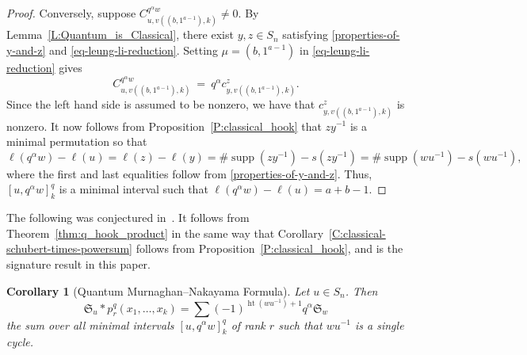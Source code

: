 \documentclass[12pt,oneside,reqno]{amsart}
\newtheorem{corollary}[theorem]{Corollary}
\theoremstyle{definition}
\numberwithin{equation}{section}
\newcommand{\frakS}{{\mathfrak S}}
\DeclareMathOperator{\het}{ht}
\DeclareMathOperator{\supp}{supp}
\begin{document}
\begin{proof}
    Conversely,
    suppose $C^{q^\alpha w}_{u,v((b, 1^{a-1}), k)} \neq 0$.
    By Lemma~\ref{L:Quantum_is_Classical},
    there exist $y, z \in S_n$ satisfying
    \eqref{properties-of-y-and-z} and \eqref{eq-leung-li-reduction}.
    Setting $\mu = (b, 1^{a-1})$ in \eqref{eq-leung-li-reduction} gives
    \begin{equation}
        C^{q^\alpha w}_{u,v((b, 1^{a-1}),k)}
        \ =\ q^\alpha c^z_{y,v((b, 1^{a-1}),k)}.
    \end{equation}
    Since the left hand side is assumed to be nonzero, we have that
    $c^z_{y,v((b, 1^{a-1}),k)}$ is nonzero.
    It now follows from Proposition~\ref{P:classical_hook} that
    $z y^{-1}$ is a minimal permutation so that
    \begin{equation*}
        \ell(q^\alpha w) - \ell(u)
        = \ell(z) - \ell(y)
        = \#\supp(z y^{-1}) - s(z y^{-1})
        = \#\supp(w u^{-1}) - s(w u^{-1}),
    \end{equation*}
    where the first and last equalities follow from \eqref{properties-of-y-and-z}.
    Thus, $[u, q^\alpha w]_k^q$ is a minimal interval such that
    $\ell(q^\alpha w) - \ell(u) = a{+}b{-}1$.
\end{proof}

The following was conjectured in~\cite{Morrison}.
It follows from Theorem~\ref{thm:q_hook_product} in the same way that
Corollary~\ref{C:classical-schubert-times-powersum} follows from Proposition~\ref{P:classical_hook},
and is the signature result in this paper.

\begin{corollary}[Quantum Murnaghan--Nakayama Formula]
    \label{C:quantumMN}
    Let $u \in S_n$. Then
    \begin{equation*}
        \frakS_u \ast p_r^q(x_1,\dotsc,x_k) = \sum (-1)^{\het(wu^{-1})+1} q^\alpha \frakS_{w}
    \end{equation*}
    the sum over all minimal intervals $[u, q^{\alpha}w]_k^q$ of rank $r$ such that $wu^{-1}$ is a
    single cycle.
\end{corollary}
\end{document}
